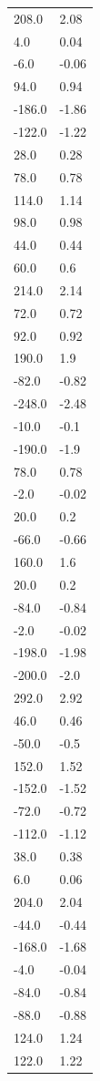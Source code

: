 \begin{longtable}{ll}
208.0 & 2.08 \\
4.0 & 0.04 \\
-6.0 & -0.06 \\
94.0 & 0.94 \\
-186.0 & -1.86 \\
-122.0 & -1.22 \\
28.0 & 0.28 \\
78.0 & 0.78 \\
114.0 & 1.14 \\
98.0 & 0.98 \\
44.0 & 0.44 \\
60.0 & 0.6 \\
214.0 & 2.14 \\
72.0 & 0.72 \\
92.0 & 0.92 \\
190.0 & 1.9 \\
-82.0 & -0.82 \\
-248.0 & -2.48 \\
-10.0 & -0.1 \\
-190.0 & -1.9 \\
78.0 & 0.78 \\
-2.0 & -0.02 \\
20.0 & 0.2 \\
-66.0 & -0.66 \\
160.0 & 1.6 \\
20.0 & 0.2 \\
-84.0 & -0.84 \\
-2.0 & -0.02 \\
-198.0 & -1.98 \\
-200.0 & -2.0 \\
292.0 & 2.92 \\
46.0 & 0.46 \\
-50.0 & -0.5 \\
152.0 & 1.52 \\
-152.0 & -1.52 \\
-72.0 & -0.72 \\
-112.0 & -1.12 \\
38.0 & 0.38 \\
6.0 & 0.06 \\
204.0 & 2.04 \\
-44.0 & -0.44 \\
-168.0 & -1.68 \\
-4.0 & -0.04 \\
-84.0 & -0.84 \\
-88.0 & -0.88 \\
124.0 & 1.24 \\
122.0 & 1.22 \\

\end{longtable}
